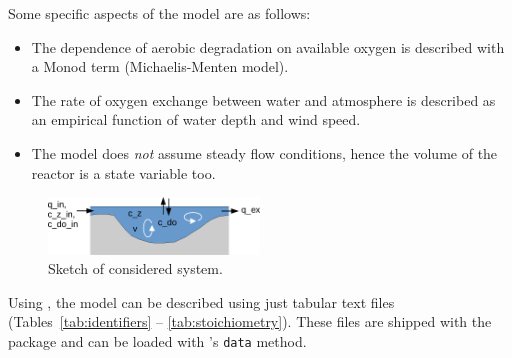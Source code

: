 \documentclass[times,onecolumn]{article}
\begin{document}
Some specific aspects of the model are as follows:
\begin{itemize}
\item The dependence of aerobic degradation on available oxygen is described with a Monod term (Michaelis-Menten model).
\item The rate of oxygen exchange between water and atmosphere is described as an empirical function of water depth and wind speed.
\item The model does \emph{not} assume steady flow conditions, hence the volume of the reactor is a state variable too.
\end{itemize}

\begin{figure}
\centering
\includegraphics[width=0.5\textwidth]{reactor.pdf}
\caption{Sketch of considered system. \label{fig:reactor}}
\end{figure}

Using , the model can be described using just tabular text files (Tables~\ref{tab:identifiers} -- \ref{tab:stoichiometry}). These files are shipped with the package and can be loaded with 's \verb|data| method.
\end{document}

